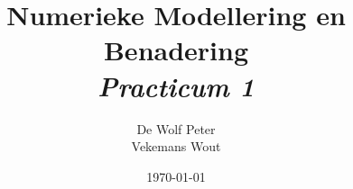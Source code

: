 \documentclass[10pt,a4paper]{article}
\begin{document}
\title{\textbf{Numerieke Modellering en Benadering}\\\textit{Practicum 1}\\}
\author{De Wolf Peter\\ Vekemans Wout}

\date{\today}
\begin{titlepage}
	\maketitle
	\thispagestyle{empty}
\end{titlepage}

\newpage

\listoffigures

\newpage
\end{document}
